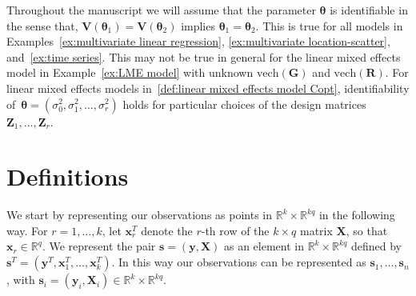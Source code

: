 \documentclass{article}
\numberwithin{equation}{section}
\theoremstyle{plain}
\newcommand{\R}{\mathbb{R}}
\newcommand{\vch}{\mathrm{vech}}
\newcommand{\btheta}{\bm\theta}
\newcommand{\by}{\mathbf{y}}
\newcommand{\bx}{\mathbf{x}}
\newcommand{\bs}{\mathbf{s}}
\newcommand{\bX}{\mathbf{X}}
\newcommand{\bV}{\mathbf{V}}
\newcommand{\bG}{\mathbf{G}}
\newcommand{\bZ}{\mathbf{Z}}
\newcommand{\bR}{\mathbf{R}}
\begin{document}
Throughout the manuscript we will assume that the parameter $\btheta$ is identifiable in the sense that,
$\bV(\btheta_1)=\bV(\btheta_2)$ implies $\btheta_1=\btheta_2$.
This is true for all models in
Examples~\ref{ex:multivariate linear regression},
\ref{ex:multivariate location-scatter}, and~\ref{ex:time series}.
This may not be true in general for the linear mixed effects model
in Example~\ref{ex:LME model} with unknown $\vch(\bG)$ and $\vch(\bR)$.
For linear mixed effects models
in~\eqref{def:linear mixed effects model Copt},
identifiability of~$\btheta=(\sigma_0^2,\sigma_1^2,\ldots,\sigma_r^2)$
holds for particular choices of the design matrices
$\bZ_1,\ldots,\bZ_r$.

\section{Definitions}
\label{sec:definitions}
We start by representing our observations as points in $\R^k\times\R^{kq}$  in the following way.
For $r=1,\ldots, k$, let $\bx_r^T$ denote the $r$-th row of the $k\times q$ matrix $\bX$,
so that~$\bx_r\in\R^q$.
We represent the pair $\mathbf{s}=(\mathbf{y},\bX)$ as an element in $\R^k\times\R^{kq}$ defined 
by~$\bs^T=(\by^T,  \bx_{1}^T,\ldots,  \bx_{k}^T)$.
In this way our observations can be represented as $\bs_1,\ldots,\bs_n$, with $\bs_i=(\by_i,\bX_i)\in\R^k\times\R^{kq}$.
\end{document}
